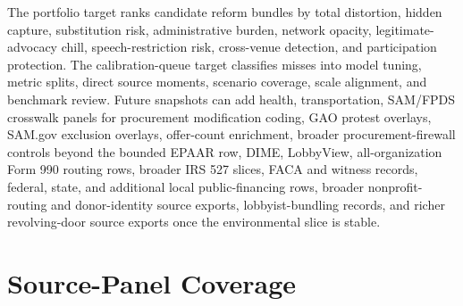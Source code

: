 The portfolio target ranks candidate reform bundles by total distortion, hidden capture, substitution risk, administrative burden, network opacity, legitimate-advocacy chill, speech-restriction risk, cross-venue detection, and participation protection. The calibration-queue target classifies misses into model tuning, metric splits, direct source moments, scenario coverage, scale alignment, and benchmark review. Future snapshots can add health, transportation, SAM/FPDS crosswalk panels for procurement modification coding, GAO protest overlays, SAM.gov exclusion overlays, offer-count enrichment, broader procurement-firewall controls beyond the bounded EPAAR row, DIME, LobbyView, all-organization Form 990 routing rows, broader IRS 527 slices, FACA and witness records, federal, state, and additional local public-financing rows, broader nonprofit-routing and donor-identity source exports, lobbyist-bundling records, and richer revolving-door source exports once the environmental slice is stable.

\section{Source-Panel Coverage}

